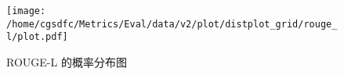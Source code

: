 \begin{figure}[H]%
\centering%
\texttt{[image: /home/cgsdfc/Metrics/Eval/data/v2/plot/distplot\_grid/rouge\_l/plot.pdf]}%
\caption{ROUGE{-}L 的概率分布图}%
\label{fig:ROUGE{-}Ldist}%
\end{figure}